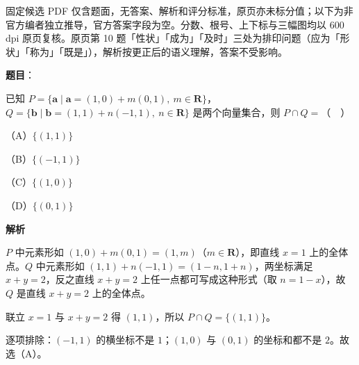 

\begin{gktip}
固定候选 PDF 仅含题面，无答案、解析和评分标准，原页亦未标分值；以下为非官方编者独立推导，官方答案字段为空。分数、根号、上下标与三幅图均以 600 dpi 原页复核。原页第 10 题「性状」「成为」「及时」三处为排印问题（应为「形状」「称为」「既是」），解析按更正后的语义理解，答案不受影响。
\end{gktip}

\begin{answer}

\textbf{题目}：

已知 $P=\{\boldsymbol a\mid\boldsymbol a=(1,0)+m(0,1),\ m\in\mathbf R\}$，$Q=\{\boldsymbol b\mid\boldsymbol b=(1,1)+n(-1,1),\ n\in\mathbf R\}$ 是两个向量集合，则 $P\cap Q=$（　）

（A）$\{(1,1)\}$

（B）$\{(-1,1)\}$

（C）$\{(1,0)\}$

（D）$\{(0,1)\}$

\textbf{解析}

$P$ 中元素形如 $(1,0)+m(0,1)=(1,m)$（$m\in\mathbf R$），即直线 $x=1$ 上的全体点。$Q$ 中元素形如 $(1,1)+n(-1,1)=(1-n,1+n)$，两坐标满足 $x+y=2$，反之直线 $x+y=2$ 上任一点都可写成这种形式（取 $n=1-x$），故 $Q$ 是直线 $x+y=2$ 上的全体点。

联立 $x=1$ 与 $x+y=2$ 得 $(1,1)$，所以 $P\cap Q=\{(1,1)\}$。

逐项排除：$(-1,1)$ 的横坐标不是 $1$；$(1,0)$ 与 $(0,1)$ 的坐标和都不是 $2$。故选（A）。


\end{answer}
